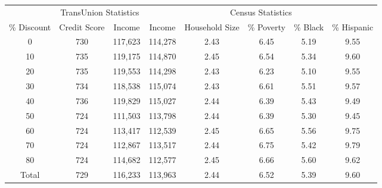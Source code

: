 \begin{tabular}{cccccccc}
\toprule 
\midrule 
 & \multicolumn{2}{c}{TransUnion Statistics} & \multicolumn{5}{c}{Census Statistics} \\
 \cmidrule(lr){2-3} \cmidrule(lr){4-8} 
\% Discount & Credit Score & Income & Income & Household Size & \% Poverty & \% Black & \% Hispanic \\
\midrule 
0 & 730 & 117,623 & 114,278 & 2.43 & 6.45 & 5.19 & 9.55 \\
10 & 735 & 119,175 & 114,870 & 2.45 & 6.54 & 5.34 & 9.60 \\
20 & 735 & 119,553 & 114,298 & 2.43 & 6.23 & 5.10 & 9.55 \\
30 & 734 & 118,538 & 115,074 & 2.43 & 6.61 & 5.51 & 9.57 \\
40 & 736 & 119,829 & 115,027 & 2.44 & 6.39 & 5.43 & 9.49 \\
50 & 724 & 111,503 & 113,798 & 2.44 & 6.39 & 5.30 & 9.45 \\
60 & 724 & 113,417 & 112,539 & 2.45 & 6.65 & 5.56 & 9.75 \\
70 & 724 & 112,867 & 113,517 & 2.44 & 6.75 & 5.42 & 9.79 \\
80 & 724 & 114,682 & 112,577 & 2.45 & 6.66 & 5.60 & 9.62 \\
\midrule 
Total & 729 & 116,233 & 113,963 & 2.44 & 6.52 & 5.39 & 9.60 \\
\midrule 
\bottomrule 
\end{tabular}

